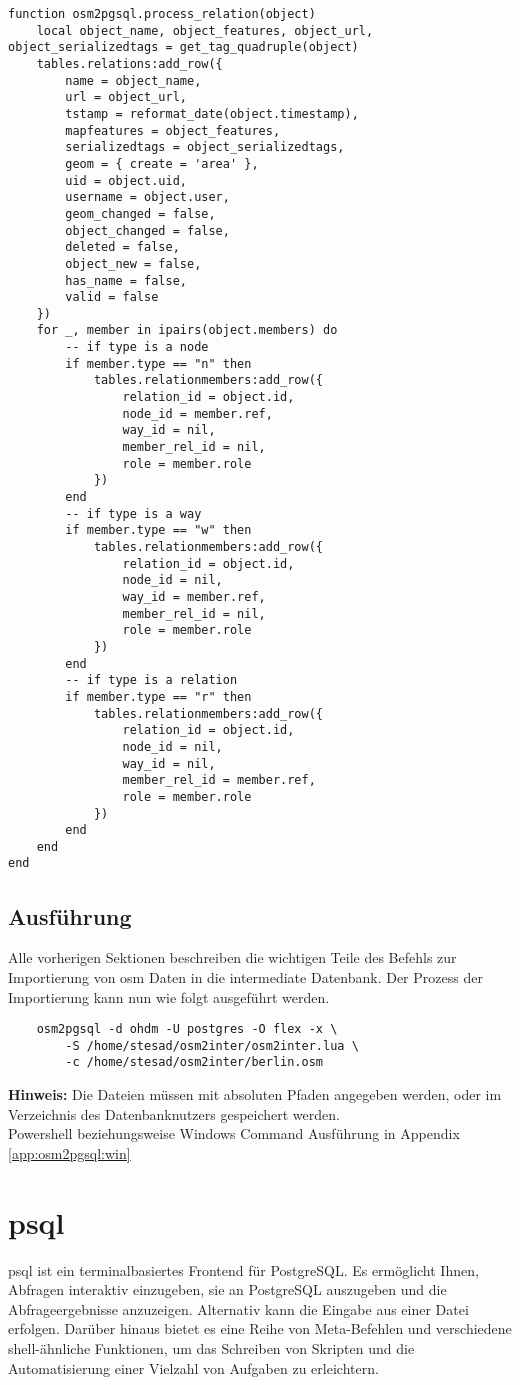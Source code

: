 \newpage\begin{lstlisting}[language={[5.0]Lua}, caption={Hilfsfunktion zur osm object.tag Verarbeitung},label={lst:process-relation}]
function osm2pgsql.process_relation(object)
	local object_name, object_features, object_url, object_serializedtags = get_tag_quadruple(object)
	tables.relations:add_row({
		name = object_name,
		url = object_url,
		tstamp = reformat_date(object.timestamp),
		mapfeatures = object_features,
		serializedtags = object_serializedtags,
		geom = { create = 'area' },
		uid = object.uid,
		username = object.user,
		geom_changed = false,
		object_changed = false,
		deleted = false,
		object_new = false,
		has_name = false,
		valid = false
	})
	for _, member in ipairs(object.members) do
		-- if type is a node
		if member.type == "n" then
			tables.relationmembers:add_row({
				relation_id = object.id,
				node_id = member.ref,
				way_id = nil,
				member_rel_id = nil,
				role = member.role
			})
		end
		-- if type is a way
		if member.type == "w" then
			tables.relationmembers:add_row({
				relation_id = object.id,
				node_id = nil,
				way_id = member.ref,
				member_rel_id = nil,
				role = member.role
			})
		end
		-- if type is a relation
		if member.type == "r" then
			tables.relationmembers:add_row({
				relation_id = object.id,
				node_id = nil,
				way_id = nil,
				member_rel_id = member.ref,
				role = member.role
			})
		end
	end
end
\end{lstlisting}


\newpage
\section{Ausführung}
Alle vorherigen Sektionen beschreiben die wichtigen Teile des Befehls zur Importierung von osm Daten in die intermediate Datenbank. Der Prozess der Importierung kann nun wie folgt ausgeführt werden.\\[0.5cm]

\begin{lstlisting}
	osm2pgsql -d ohdm -U postgres -O flex -x \
		-S /home/stesad/osm2inter/osm2inter.lua \
		-c /home/stesad/osm2inter/berlin.osm
\end{lstlisting}
\textbf{Hinweis:} Die Dateien müssen mit absoluten Pfaden angegeben werden, oder im Verzeichnis des Datenbanknutzers gespeichert werden.\\
Powershell beziehungsweise Windows Command Ausführung in Appendix \autoref{app:osm2pgsql:win}

\chapter{psql}
psql ist ein terminalbasiertes Frontend für PostgreSQL. Es ermöglicht Ihnen, Abfragen interaktiv einzugeben, sie an PostgreSQL auszugeben und die Abfrageergebnisse anzuzeigen. Alternativ kann die Eingabe aus einer Datei erfolgen. Darüber hinaus bietet es eine Reihe von Meta-Befehlen und verschiedene shell-ähnliche Funktionen, um das Schreiben von Skripten und die Automatisierung einer Vielzahl von Aufgaben zu erleichtern.\cite{postgres-psql}


